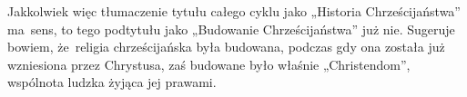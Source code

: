 \documentclass[a4paper,11pt]{article}
\begin{document}
Jakkolwiek więc tłumaczenie tytułu całego cyklu jako „Historia
Chrześcijaństwa” ma~sens, to tego podtytułu jako „Budowanie
Chrześcijaństwa” już nie. Sugeruje bowiem, że~religia chrześcijańska
była budowana, podczas gdy ona została już wzniesiona przez Chrystusa,
zaś budowane było właśnie „Christendom”, wspólnota ludzka żyjąca jej
prawami.

\vspace{\spaceFour}










\newpage

\end{document}
